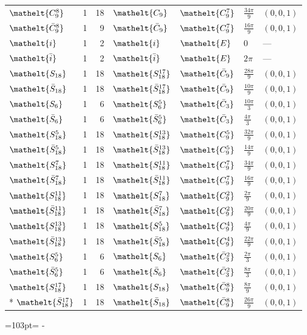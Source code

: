 \documentclass[10pt,a4paper]{article}
\newcommand{\needspace}[1]{\par\penalty-100\begingroup\dimen0=#1\relax\dimen2=\pagegoal
  \advance\dimen2-\pagetotal\ifdim\dimen0>\dimen2\relax\ifdim\dimen2>0pt\vfil\break\fi\fi
  \endgroup}
\numberwithin{equation}{section}
\newcommand{\eltfont}[1]{{\let\sigma\eltsigma\mathelt{#1}}}
\newcommand{\cls}[1]{\eltfont{#1}}
\newcommand{\dirvec}[3]{(#1, #2, #3)}
\newcommand{\barred}[1]{\bar{#1}}
\begin{document}
{\begin{longtable}{@{}lrrllll@{}}
$\cls{C_{9}^{8}}$ & 1 & 18 & $\cls{C_{9}}$ & $\cls{C_{9}^{7}}$ & $\tfrac{34\pi}{9}$ & $\dirvec{0}{0}{1}$\\
$\cls{\barred{C}_{9}^{8}}$ & 1 & 9 & $\cls{\barred{C}_{9}}$ & $\cls{C_{9}^{7}}$ & $\tfrac{16\pi}{9}$ & $\dirvec{0}{0}{1}$\\
$\cls{i}$ & 1 & 2 & $\cls{i}$ & $\cls{E}$ & $0$ & ---\\
$\cls{\barred{i}}$ & 1 & 2 & $\cls{\barred{i}}$ & $\cls{E}$ & $2\pi$ & ---\\
$\cls{S_{18}}$ & 1 & 18 & $\cls{S_{18}^{17}}$ & $\cls{\barred{C}_{9}}$ & $\tfrac{28\pi}{9}$ & $\dirvec{0}{0}{1}$\\
$\cls{\barred{S}_{18}}$ & 1 & 18 & $\cls{\barred{S}_{18}^{17}}$ & $\cls{\barred{C}_{9}}$ & $\tfrac{10\pi}{9}$ & $\dirvec{0}{0}{1}$\\
$\cls{S_{6}}$ & 1 & 6 & $\cls{S_{6}^{5}}$ & $\cls{\barred{C}_{3}}$ & $\tfrac{10\pi}{3}$ & $\dirvec{0}{0}{1}$\\
$\cls{\barred{S}_{6}}$ & 1 & 6 & $\cls{\barred{S}_{6}^{5}}$ & $\cls{\barred{C}_{3}}$ & $\tfrac{4\pi}{3}$ & $\dirvec{0}{0}{1}$\\
$\cls{S_{18}^{5}}$ & 1 & 18 & $\cls{S_{18}^{13}}$ & $\cls{C_{9}^{5}}$ & $\tfrac{32\pi}{9}$ & $\dirvec{0}{0}{1}$\\
$\cls{\barred{S}_{18}^{5}}$ & 1 & 18 & $\cls{\barred{S}_{18}^{13}}$ & $\cls{C_{9}^{5}}$ & $\tfrac{14\pi}{9}$ & $\dirvec{0}{0}{1}$\\
$\cls{S_{18}^{7}}$ & 1 & 18 & $\cls{S_{18}^{11}}$ & $\cls{C_{9}^{7}}$ & $\tfrac{34\pi}{9}$ & $\dirvec{0}{0}{1}$\\
$\cls{\barred{S}_{18}^{7}}$ & 1 & 18 & $\cls{\barred{S}_{18}^{11}}$ & $\cls{C_{9}^{7}}$ & $\tfrac{16\pi}{9}$ & $\dirvec{0}{0}{1}$\\
$\cls{S_{18}^{11}}$ & 1 & 18 & $\cls{S_{18}^{7}}$ & $\cls{C_{9}^{2}}$ & $\tfrac{2\pi}{9}$ & $\dirvec{0}{0}{1}$\\
$\cls{\barred{S}_{18}^{11}}$ & 1 & 18 & $\cls{\barred{S}_{18}^{7}}$ & $\cls{C_{9}^{2}}$ & $\tfrac{20\pi}{9}$ & $\dirvec{0}{0}{1}$\\
$\cls{S_{18}^{13}}$ & 1 & 18 & $\cls{S_{18}^{5}}$ & $\cls{C_{9}^{4}}$ & $\tfrac{4\pi}{9}$ & $\dirvec{0}{0}{1}$\\
$\cls{\barred{S}_{18}^{13}}$ & 1 & 18 & $\cls{\barred{S}_{18}^{5}}$ & $\cls{C_{9}^{4}}$ & $\tfrac{22\pi}{9}$ & $\dirvec{0}{0}{1}$\\
$\cls{S_{6}^{5}}$ & 1 & 6 & $\cls{S_{6}}$ & $\cls{\barred{C}_{3}^{2}}$ & $\tfrac{2\pi}{3}$ & $\dirvec{0}{0}{1}$\\
$\cls{\barred{S}_{6}^{5}}$ & 1 & 6 & $\cls{\barred{S}_{6}}$ & $\cls{\barred{C}_{3}^{2}}$ & $\tfrac{8\pi}{3}$ & $\dirvec{0}{0}{1}$\\
$\cls{S_{18}^{17}}$ & 1 & 18 & $\cls{S_{18}}$ & $\cls{\barred{C}_{9}^{8}}$ & $\tfrac{8\pi}{9}$ & $\dirvec{0}{0}{1}$\\*
$\cls{\barred{S}_{18}^{17}}$ & 1 & 18 & $\cls{\barred{S}_{18}}$ & $\cls{\barred{C}_{9}^{8}}$ & $\tfrac{26\pi}{9}$ & $\dirvec{0}{0}{1}$\\
\bottomrule\end{longtable}}
\needspace{103pt}
\end{document}
